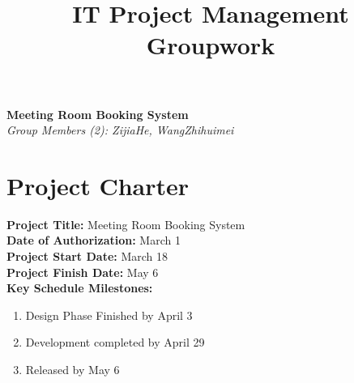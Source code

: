 \documentclass[runningheads]{llncs}
\begin{document}
\title{\large{IT Project Management Groupwork}}
\author{}
\institute{}
\maketitle
\vspace{-1cm}



\begin{center}
\Large{\textbf{Meeting Room Booking System}} \\ %
\vspace{0.2cm}
\large{\emph{Group Members (2): ZijiaHe, WangZhihuimei}} \\%
\vspace{0.3cm}  
\end{center}

\noindent
\section{Project Charter}
\textbf{Project Title:} Meeting Room Booking System\\
\textbf{Date of Authorization:} March 1\\
\textbf{Project Start Date:} March 18\\
\textbf{Project Finish Date:} May 6\\
\textbf{Key Schedule Milestones:}
\begin{enumerate}
  \item Design Phase Finished by April 3
  \item Development completed by April 29
  \item Released by May 6
\end{enumerate}
\end{document}
